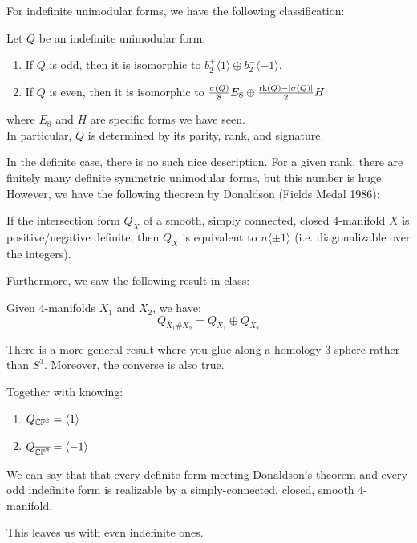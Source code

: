 \documentclass[12pt]{amsart}
\begin{document}
For indefinite unimodular forms, we have the following classification: 
\begin{theorem}
    Let $Q$ be an indefinite unimodular form. 
    \begin{enumerate}
        \item If $Q$ is odd, then it is isomorphic to $b_2^+\langle 1 \rangle \oplus b_2^{-}\langle -1 \rangle$.
        \item If $Q$ is even, then it is isomorphic to $\frac{\sigma(Q)}{8}E_8 \oplus \frac{\operatorname{rk}(Q) - |\sigma(Q)|}{2}H$
    \end{enumerate} 
    where $E_8$ and $H$ are specific forms we have seen. \\
    In particular, $Q$ is determined by its parity, rank, and signature. 
\end{theorem}

In the definite case, there is no such nice description. For a given rank, there are finitely many definite symmetric unimodular forms, but this number is huge. However, we have the following theorem by Donaldson (Fields Medal 1986):
\begin{theorem}[Donaldson]
    If the intersection form $Q_X$ of a smooth, simply connected, closed $4$-manifold $X$ is positive/negative definite, then $Q_X$ is equivalent to $n\langle \pm 1\rangle$ (i.e. diagonalizable over the integers). 
\end{theorem}

Furthermore, we saw the following result in class:
\begin{lemma}
    Given $4$-manifolds $X_1$ and $X_2$, we have:
    \[ Q_{X_1 \# X_2} = Q_{X_1} \oplus Q_{X_2}\]
\end{lemma}
\begin{remark}
    There is a more general result where you glue along a homology $3$-sphere rather than $S^3$. Moreover, the converse is also true.
\end{remark}

Together with knowing:
\begin{enumerate}
    \item $Q_{\mathbb{CP}^2} = \langle 1 \rangle$
    \item $Q_{\overline{\mathbb{CP}^2}} = \langle -1 \rangle$
\end{enumerate}
We can say that that every definite form meeting Donaldson's theorem and every odd indefinite form is realizable by a simply-connected, closed, smooth $4$-manifold. 

This leaves us with even indefinite ones.
\end{document}
